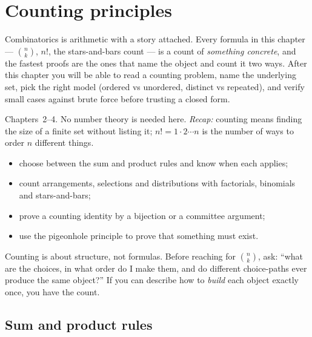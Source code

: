 \chapter{Counting principles}\label{ch:count}

Combinatorics is arithmetic with a story attached. Every formula in this
chapter --- $\binom{n}{k}$, $n!$, the stars-and-bars count --- is a count of
\emph{something concrete}, and the fastest proofs are the ones that name
the object and count it two ways. After this chapter you will be able to
read a counting problem, name the underlying set, pick the right model
(ordered vs unordered, distinct vs repeated), and verify small cases
against brute force before trusting a closed form.

\begin{rulebox}
Chapters~2--4. No number theory is needed here. \emph{Recap:} counting means finding the size of a finite set without listing it; $n!=1\cdot2\cdots n$ is the number of ways to order $n$ different things.
\end{rulebox}
\begin{wins}
\begin{itemize}
\item choose between the sum and product rules and know when each applies;
\item count arrangements, selections and distributions with factorials, binomials and stars-and-bars;
\item prove a counting identity by a bijection or a committee argument;
\item use the pigeonhole principle to prove that something must exist.
\end{itemize}
\end{wins}
\begin{principle}
Counting is about structure, not formulas. Before reaching for $\binom{n}{k}$, ask: ``what are the choices, in what order do I make them, and do different choice-paths ever produce the same object?'' If you can describe how to \emph{build} each object exactly once, you have the count.
\end{principle}

\section{Sum and product rules}\label{sec:rules}

